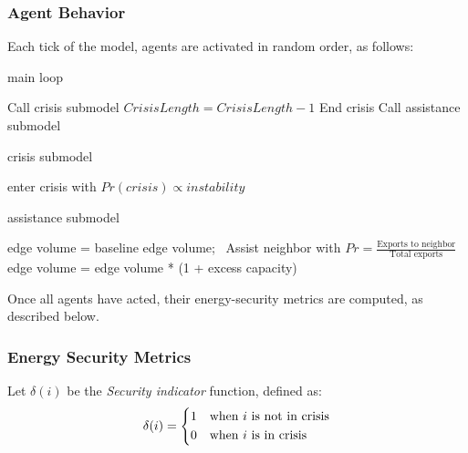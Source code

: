 \documentclass{article}
\begin{document}
\subsubsection{Agent Behavior}

Each tick of the model, agents are activated in random order, as follows:

\begin{algorithm}[H]
	\caption{main loop}
	 {
			Call crisis submodel \;
		}{
			$Crisis Length = Crisis Length - 1$ \;
			 { End crisis \; }
		}
	 {
		Call assistance submodel \;
	}	
\end{algorithm}

\begin{algorithm}[H]
	\caption{crisis submodel}
		enter crisis with $Pr(crisis) \propto instability$ \;
\end{algorithm}


\begin{algorithm}[H]
	\caption{assistance submodel}
	 {
			 {
				 {
					edge volume = baseline edge volume;\
				}
			}
		} {
			 {
				 {
					Assist neighbor with $Pr = \frac{\text{Exports to neighbor}}{\text{Total exports}}$
				}
			}
			 {
				 {
					edge volume = edge volume * (1 + excess capacity)\;
				}
			}
		}

\end{algorithm}

Once all agents have acted, their energy-security metrics are computed, as described below.

\subsubsection{Energy Security Metrics}

Let $\delta(i)$ be the \emph{Security indicator} function, defined as:
\[
\delta(i) = \begin{dcases*}
	1 & when $i$ is not in crisis\\
	0 & when $i$ is in crisis
\end{dcases*}
\]
\end{document}
